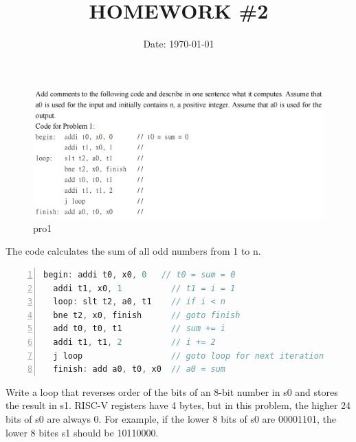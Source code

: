 \documentclass[cn,12pt]{homework}
\title{HOMEWORK \#2} %
\date{Date: \today} %
\institute{ZHEJIANG UNIVERSITY\quad COLLEGE OF INFORMATION SCIENCE AND ELECTRONICS ENGINEERING} %
\begin{document}
\maketitle



\begin{problem}
\begin{figure}[h!]
  \centering
  \includegraphics[width=1\textwidth]{./figures/image1.png}
  \caption{pro1}
  \label{fig:pro1}
\end{figure}

\end{problem}




\begin{solution}
  \quad
  The code calculates the sum of all odd numbers from 1 to n.
  \begin{lstlisting}[language=C, caption=Code for Problem 1, label=code:example, frame=single, numbers=left, numberstyle=\tiny, breaklines=true, backgroundcolor=\color{lightgray}]
  begin: addi t0, x0, 0   // t0 = sum = 0
  addi t1, x0, 1          // t1 = i = 1
  loop: slt t2, a0, t1    // if i < n
  bne t2, x0, finish      // goto finish
  add t0, t0, t1          // sum += i
  addi t1, t1, 2          // i += 2
  j loop                  // goto loop for next iteration
  finish: add a0, t0, x0  // a0 = sum
  \end{lstlisting}

\end{solution}
\begin{problem}
  \quad
Write a loop that reverses order of the bits of an 8-bit number in s0 and stores the result in s1.
RISC-V registers have 4 bytes, but in this problem, the higher 24 bits of s0 are always 0. For
example, if the lower 8 bits of s0 are 00001101, the lower 8 bites s1 should be 10110000.
\end{problem}
\end{document}
